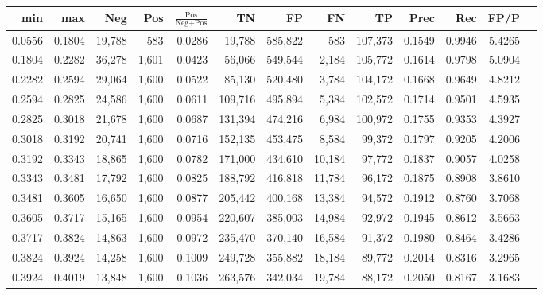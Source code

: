 \begin{tabular}{rrrrrrrrrrrrr}
\toprule
   min &    max &    Neg &   Pos & $\frac{\text{Pos}}{\text{Neg}+\text{Pos}}$ &      TN &      FP &      FN &      TP &   Prec &    Rec &   FP/P \\
\midrule
0.0556 & 0.1804 & 19,788 &   583 &                                     0.0286 &  19,788 & 585,822 &     583 & 107,373 & 0.1549 & 0.9946 & 5.4265 \\
0.1804 & 0.2282 & 36,278 & 1,601 &                                     0.0423 &  56,066 & 549,544 &   2,184 & 105,772 & 0.1614 & 0.9798 & 5.0904 \\
0.2282 & 0.2594 & 29,064 & 1,600 &                                     0.0522 &  85,130 & 520,480 &   3,784 & 104,172 & 0.1668 & 0.9649 & 4.8212 \\
0.2594 & 0.2825 & 24,586 & 1,600 &                                     0.0611 & 109,716 & 495,894 &   5,384 & 102,572 & 0.1714 & 0.9501 & 4.5935 \\
0.2825 & 0.3018 & 21,678 & 1,600 &                                     0.0687 & 131,394 & 474,216 &   6,984 & 100,972 & 0.1755 & 0.9353 & 4.3927 \\
0.3018 & 0.3192 & 20,741 & 1,600 &                                     0.0716 & 152,135 & 453,475 &   8,584 &  99,372 & 0.1797 & 0.9205 & 4.2006 \\
0.3192 & 0.3343 & 18,865 & 1,600 &                                     0.0782 & 171,000 & 434,610 &  10,184 &  97,772 & 0.1837 & 0.9057 & 4.0258 \\
0.3343 & 0.3481 & 17,792 & 1,600 &                                     0.0825 & 188,792 & 416,818 &  11,784 &  96,172 & 0.1875 & 0.8908 & 3.8610 \\
0.3481 & 0.3605 & 16,650 & 1,600 &                                     0.0877 & 205,442 & 400,168 &  13,384 &  94,572 & 0.1912 & 0.8760 & 3.7068 \\
0.3605 & 0.3717 & 15,165 & 1,600 &                                     0.0954 & 220,607 & 385,003 &  14,984 &  92,972 & 0.1945 & 0.8612 & 3.5663 \\
0.3717 & 0.3824 & 14,863 & 1,600 &                                     0.0972 & 235,470 & 370,140 &  16,584 &  91,372 & 0.1980 & 0.8464 & 3.4286 \\
0.3824 & 0.3924 & 14,258 & 1,600 &                                     0.1009 & 249,728 & 355,882 &  18,184 &  89,772 & 0.2014 & 0.8316 & 3.2965 \\
0.3924 & 0.4019 & 13,848 & 1,600 &                                     0.1036 & 263,576 & 342,034 &  19,784 &  88,172 & 0.2050 & 0.8167 & 3.1683 \\

\end{tabular}
